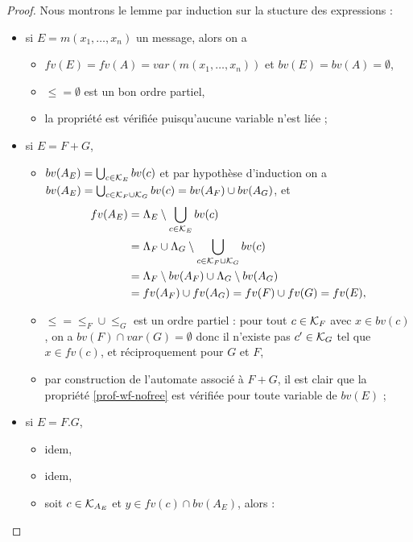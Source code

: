 \begin{proof}
Nous montrons le lemme par induction sur la stucture des expressions :
\begin{itemize}
      \item si $E=m(x_1,\dots,x_n)$ un message, alors on a
        \begin{itemize}
          \item $fv(E) = fv(A) = var(m(x_1,\dots,x_n))$ et $bv(E) =
          bv(A) = \emptyset$,
          \item $\leq = \emptyset$  est un bon ordre partiel,
          \item la propri\'et\'e est v\'erifi\'ee puisqu'aucune
            variable n'est li\'ee ;
  \end{itemize}
\item si $E=F+G$,
  \begin{itemize}
    \item $bv(A_E) = \bigcup_{c\in {\cal K}_E} bv(c)$ et par
    hypoth\`ese d'induction on a $ bv(A_E) = \bigcup_{c\in
    {\cal K}_F \cup {\cal K}_G} bv(c) = bv(A_F) \cup bv(A_G)$, et
  \begin{align*}
      fv(A_E)& = \Lambda_E\setminus \bigcup_{c\in {\cal K}_E} bv(c) \\
      & = \Lambda_F \cup \Lambda_G \setminus \bigcup_{c\in {\cal K}_F
      \cup {\cal K}_G} bv(c) \\
&= \Lambda_F \setminus bv(A_F) \cup \Lambda_G\setminus bv(A_G) \\
&= fv(A_F) \cup fv(A_G) = fv(F) \cup fv(G) = fv(E),
  \end{align*}
\item $\leq = \leq_F \cup \leq_G$ est un ordre partiel : pour tout
  $c\in {\cal K}_F$ avec $x\in bv(c)$, on a $bv(F) \cap var(G) =
  \emptyset$ donc il n'existe pas $c'\in {\cal K}_G$ tel que $x\in
  fv(c)$, et r\'eciproquement pour $G$ et $F$,
\item par construction de l'automate associ\'e \`a $F+G$, il est
  clair que la propri\'et\'e \ref{prof-wf-nofree} est v\'erifi\'ee
  pour toute variable de $bv(E)$ ;
  \end{itemize}
\item si $E=F.G$,
  \begin{itemize}
    \item idem,
    \item idem,
    \item soit $c\in {\cal K}_{A_E}$ et $y\in fv(c) \cap bv(A_E)$,
    alors :
    \begin{itemize}

\end{itemize}
\end{itemize}
\end{itemize}
\end{proof}
